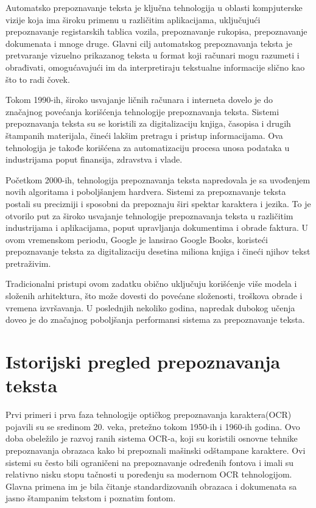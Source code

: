 \documentclass[a4paper,12pt]{article}
\begin{document}
	Automatsko prepoznavanje teksta je ključna tehnologija u oblasti kompjuterske vizije koja ima široku primenu u različitim aplikacijama, uključujući prepoznavanje registarskih tablica vozila, prepoznavanje rukopisa, prepoznavanje dokumenata i mnoge druge. Glavni cilj automatskog prepoznavanja teksta je pretvaranje vizuelno prikazanog teksta u format koji računari mogu razumeti i obrađivati, omogućavajući im da interpretiraju tekstualne informacije slično kao što to radi čovek.
	\newline
	
	Tokom 1990-ih, široko usvajanje ličnih računara i interneta dovelo je do značajnog povećanja korišćenja tehnologije prepoznavanja teksta. Sistemi prepoznavanja teksta su se koristili za digitalizaciju knjiga, časopisa i drugih štampanih materijala, čineći lakšim pretragu i pristup informacijama. Ova tehnologija je takođe korišćena za automatizaciju procesa unosa podataka u industrijama poput finansija, zdravstva i vlade.
	
	Početkom 2000-ih, tehnologija prepoznavanja teksta napredovala je sa uvođenjem novih algoritama i poboljšanjem hardvera. Sistemi za prepoznavanje teksta postali su precizniji i sposobni da prepoznaju širi spektar karaktera i jezika. To je otvorilo put za široko usvajanje tehnologije prepoznavanja teksta u različitim industrijama i aplikacijama, poput upravljanja dokumentima i obrade faktura. U ovom vremenskom periodu, Google je lansirao Google Books, koristeći prepoznavanje teksta za digitalizaciju desetina miliona knjiga i čineći njihov tekst pretraživim.
	\newline
	
	Tradicionalni pristupi ovom zadatku obično uključuju korišćenje više modela i složenih arhitektura, što može dovesti do povećane složenosti, troškova obrade i vremena izvršavanja. U poslednjih nekoliko godina, napredak dubokog učenja doveo je do značajnog poboljšanja performansi sistema za prepoznavanje teksta.
	\newpage
	
	
	\section{Istorijski pregled prepoznavanja teksta}
	
	Prvi primeri i prva faza tehnologije optičkog prepoznavanja karaktera(OCR) pojavili su se sredinom 20. veka, pretežno tokom 1950-ih i 1960-ih godina. Ovo doba obeležilo je razvoj ranih sistema OCR-a, koji su koristili osnovne tehnike prepoznavanja obrazaca kako bi prepoznali mašinski odštampane karaktere. Ovi sistemi su često bili ograničeni na prepoznavanje određenih fontova i imali su relativno nisku stopu tačnosti u poređenju sa modernom OCR tehnologijom. Glavna primena im je bila čitanje standardizovanih obrazaca i dokumenata sa jasno štampanim tekstom i poznatim fontom.
	
\end{document}
